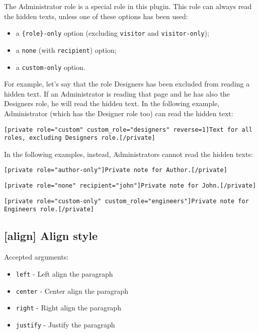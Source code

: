 \documentclass[a4paper,10pt]{article}
\begin{document}
The Administrator role is a special role in this plugin. This role can always read the hidden texts, unless one of these options has been used:

\begin{itemize}
 \item a \verb+{role}-only+ option (excluding \verb+visitor+ and \verb+visitor-only+);
 \item a \verb+none+ (with \verb+recipient+) option;
 \item a \verb+custom-only+ option.
\end{itemize}

For example, let's say that the role Designers has been excluded from reading a hidden text. If an Administrator is reading that page and he has also the Designers role, he will read the hidden text. In the following example, Administrator (which has the Designer role too) can read the hidden text:

\begin{lstlisting}
[private role="custom" custom_role="designers" reverse=1]Text for all roles, excluding Designers role.[/private]
\end{lstlisting}

In the following examples, instead, Administrators cannot read the hidden texts:

\begin{lstlisting}
[private role="author-only"]Private note for Author.[/private]
\end{lstlisting}

\begin{lstlisting}
[private role="none" recipient="john"]Private note for John.[/private]
\end{lstlisting}

\begin{lstlisting}
[private role="custom-only" custom_role="engineers"]Private note for Engineers role.[/private]
\end{lstlisting}

\subsection{[align] Align style}

Accepted arguments:

\begin{itemize}
 \item \verb+left+ - Left align the paragraph
 \item \verb+center+ - Center align the paragraph
 \item \verb+right+ - Right align the paragraph
 \item \verb+justify+ - Justify the paragraph
\end{itemize}
\end{document}
